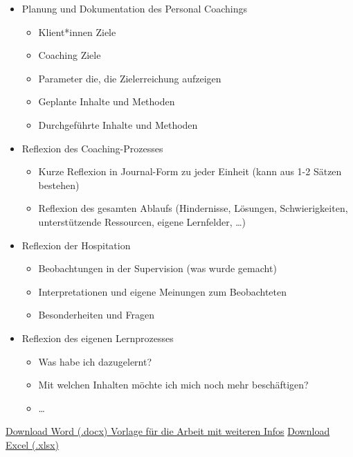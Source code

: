\documentclass[
  letterpaper,
  DIV=11,
  numbers=noendperiod]{scrreprt}
\providecommand{\tightlist}{%
  \setlength{\itemsep}{0pt}\setlength{\parskip}{0pt}}
\begin{document}
\begin{itemize}
\tightlist
\item
  Planung und Dokumentation des Personal Coachings

  \begin{itemize}
  \tightlist
  \item
    Klient*innen Ziele
  \item
    Coaching Ziele
  \item
    Parameter die, die Zielerreichung aufzeigen
  \item
    Geplante Inhalte und Methoden
  \item
    Durchgeführte Inhalte und Methoden
  \end{itemize}
\item
  Reflexion des Coaching-Prozesses

  \begin{itemize}
  \tightlist
  \item
    Kurze Reflexion in Journal-Form zu jeder Einheit (kann aus 1-2
    Sätzen bestehen)
  \item
    Reflexion des gesamten Ablaufs (Hindernisse, Lösungen,
    Schwierigkeiten, unterstützende Ressourcen, eigene Lernfelder,
    \ldots)
  \end{itemize}
\item
  Reflexion der Hospitation

  \begin{itemize}
  \tightlist
  \item
    Beobachtungen in der Supervision (was wurde gemacht)
  \item
    Interpretationen und eigene Meinungen zum Beobachteten
  \item
    Besonderheiten und Fragen
  \end{itemize}
\item
  Reflexion des eigenen Lernprozesses

  \begin{itemize}
  \tightlist
  \item
    Was habe ich dazugelernt?
  \item
    Mit welchen Inhalten möchte ich mich noch mehr beschäftigen?
  \item
    \ldots{}
  \end{itemize}
\end{itemize}

\href{Intro_files/PCoaching_SEMESTER_LASTNAME_Firstname.docx}{Download
Word (.docx) Vorlage für die Arbeit mit weiteren Infos}
\href{Intro_files/Checklisten.xlsx}{Download Excel (.xlsx)}
\end{document}
